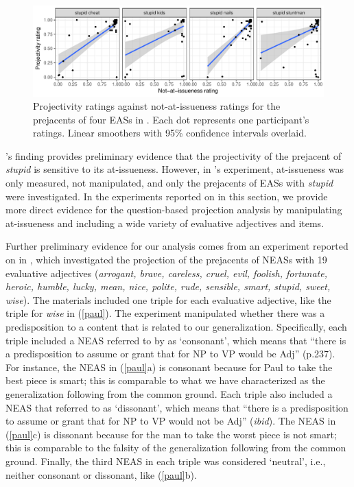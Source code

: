 \documentclass[11pt,fleqn]{article}
\newcommand{\6}{\mbox{$[\hspace*{-.6mm}[$}}
\newcommand{\9}{\mbox{$]\hspace*{-.6mm}]$}}
\newcommand{\citepos}[1]{\citeauthor{#1}'s \citeyear{#1}}
\begin{document}
\begin{figure}[h!]
\centering

\includegraphics[width=.95\textwidth]{figures/Exp1a-subject-projai-stupid}

\caption{Projectivity ratings against not-at-issueness ratings for the prejacents of four EASs in \citealt{tbd-variability}. Each dot represents one participant's ratings. Linear smoothers with 95\% confidence intervals overlaid.}
\label{f-corr}
\end{figure}
\citepos{tbd-variability} finding provides preliminary evidence that the projectivity of the prejacent of {\em stupid} is sensitive to its at-issueness. However, in \citepos{tbd-variability} experiment, at-issueness was only measured, not manipulated, and only the prejacents of EASs with {\em stupid} were investigated. In the experiments reported on in this section, we provide more direct evidence for the question-based projection analysis by manipulating at-issueness and including a wide variety of evaluative adjectives and items.

Further preliminary evidence for our analysis comes from an experiment reported on in \citealt{karttunen-etal2014}, which investigated the projection of the prejacents of NEASs with 19 evaluative adjectives ({\em arrogant, brave, careless, cruel, evil, foolish, fortunate, heroic, humble, lucky, mean, nice, polite, rude, sensible, smart, stupid, sweet, wise}). The materials included one triple for each evaluative adjective, like the triple for {\em wise} in (\ref{paul}). The experiment manipulated whether there was a predisposition to a content that is related to our generalization. Specifically, each triple included a NEAS referred to by \citet{karttunen-etal2014} as `consonant', which means that ``there is a predisposition to assume or grant that for NP to VP would be Adj'' (p.237). For instance, the NEAS in (\ref{paul}a) is consonant because for Paul to take the best piece is smart; this is comparable to what we have characterized as the generalization following from the common ground. Each triple also included a NEAS that \citet{karttunen-etal2014} referred to as `dissonant', which means that ``there is a predisposition to assume or grant that for NP to VP would not be Adj'' ({\em ibid}). The NEAS in (\ref{paul}c) is dissonant because for the man to take the worst piece is not smart; this is comparable to the falsity of the generalization following from the common ground. Finally, the third NEAS in each triple was considered `neutral', i.e., neither consonant or dissonant, like (\ref{paul}b).
\end{document}
